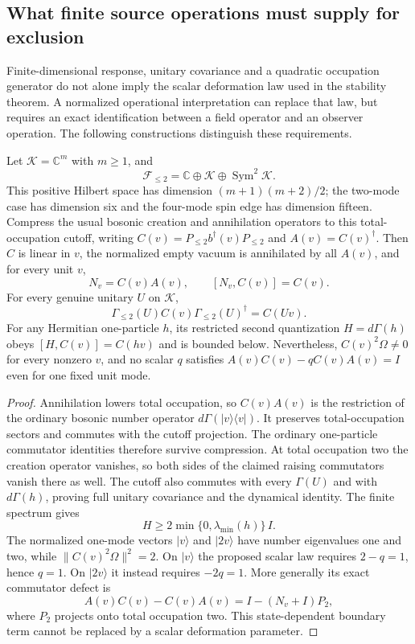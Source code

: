 \subsection{What finite source operations must supply for exclusion}
\label{sec:pauli-source-selection-boundary}

Finite-dimensional response, unitary covariance and a quadratic occupation
generator do not alone imply the scalar deformation law used in the
stability theorem. A normalized operational interpretation can replace
that law, but requires an exact identification between a field operator
and an observer operation. The following constructions distinguish these
requirements.

\begin{proposition}
\label{prop:covariant-cutoff-statistics-boundary}
Let $\mathcal K=\mathbb C^m$ with $m\geq1$, and
\[
 \mathcal F_{\leq2}
   =\mathbb C\oplus\mathcal K\oplus\operatorname{Sym}^2\mathcal K.
\]
This positive Hilbert space has dimension $(m+1)(m+2)/2$; the two-mode
case has dimension six and the four-mode spin edge has dimension fifteen.
Compress the usual bosonic
creation and annihilation operators to this total-occupation cutoff,
writing $C(v)=P_{\leq2}b^\dagger(v)P_{\leq2}$ and $A(v)=C(v)^\dagger$.
Then $C$ is linear in $v$, the normalized empty vacuum is annihilated
by all $A(v)$, and for every unit $v$,
\[
 N_v=C(v)A(v),\qquad [N_v,C(v)]=C(v).
\]
For every genuine unitary $U$ on $\mathcal K$,
\[
 \Gamma_{\leq2}(U)C(v)\Gamma_{\leq2}(U)^\dagger=C(Uv).
\]
For any Hermitian one-particle $h$, its restricted second quantization
$H=d\Gamma(h)$ obeys
$[H,C(v)]=C(hv)$ and is bounded below. Nevertheless,
$C(v)^2\Omega\ne0$ for every nonzero $v$, and no scalar $q$ satisfies
$A(v)C(v)-qC(v)A(v)=I$ even for one fixed unit mode.
\end{proposition}
\begin{proof}
Annihilation lowers total occupation, so $C(v)A(v)$ is the restriction
of the ordinary bosonic number operator
$d\Gamma(|v\rangle\langle v|)$. It preserves total-occupation sectors
and commutes with the cutoff projection. The ordinary one-particle
commutator identities therefore survive compression. At total occupation
two the creation operator vanishes, so both sides of the claimed raising
commutators vanish there as well. The cutoff also commutes with every
$\Gamma(U)$ and with $d\Gamma(h)$, proving full unitary covariance and
the dynamical identity. The finite spectrum gives
\[
 H\geq 2\min\{0,\lambda_{\min}(h)\}\,I.
\]
The normalized one-mode vectors $|v\rangle$ and $|2v\rangle$ have
number eigenvalues one and two, while
$\|C(v)^2\Omega\|^2=2$. On $|v\rangle$ the proposed scalar law
requires $2-q=1$, hence $q=1$. On $|2v\rangle$ it instead requires
$-2q=1$. More generally its exact commutator defect is
\[
 A(v)C(v)-C(v)A(v)=I-(N_v+I)P_2,
\]
where $P_2$ projects onto total occupation two. This state-dependent
boundary term cannot be replaced by a scalar deformation parameter.
\end{proof}

